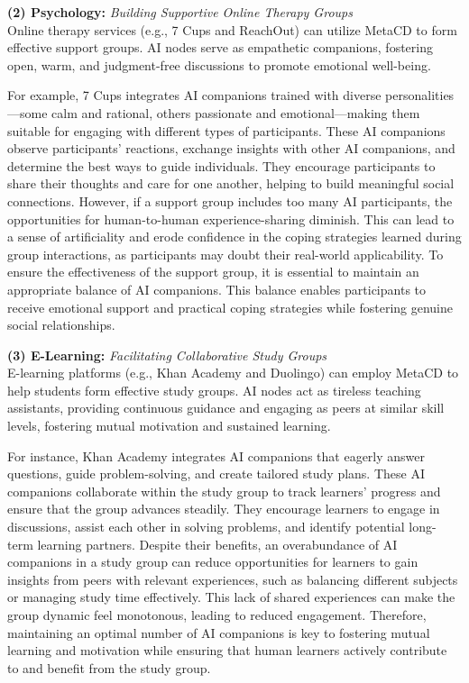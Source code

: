 \noindent \textbf{(2) Psychology:} \textit{Building Supportive Online Therapy Groups}\\ 
Online therapy services (e.g., 7 Cups and ReachOut) can utilize MetaCD to form effective support groups. AI nodes serve as empathetic companions, fostering open, warm, and judgment-free discussions to promote emotional well-being.

For example, 7 Cups integrates AI companions trained with diverse personalities—some calm and rational, others passionate and emotional—making them suitable for engaging with different types of participants. These AI companions observe participants’ reactions, exchange insights with other AI companions, and determine the best ways to guide individuals. They encourage participants to share their thoughts and care for one another, helping to build meaningful social connections. However, if a support group includes too many AI participants, the opportunities for human-to-human experience-sharing diminish. This can lead to a sense of artificiality and erode confidence in the coping strategies learned during group interactions, as participants may doubt their real-world applicability. To ensure the effectiveness of the support group, it is essential to maintain an appropriate balance of AI companions. This balance enables participants to receive emotional support and practical coping strategies while fostering genuine social relationships.

\noindent \textbf{(3) E-Learning:} \textit{Facilitating Collaborative Study Groups}\\
E-learning platforms (e.g., Khan Academy and Duolingo) can employ MetaCD to help students form effective study groups. AI nodes act as tireless teaching assistants, providing continuous guidance and engaging as peers at similar skill levels, fostering mutual motivation and sustained learning.

For instance, Khan Academy integrates AI companions that eagerly answer questions, guide problem-solving, and create tailored study plans. These AI companions collaborate within the study group to track learners’ progress and ensure that the group advances steadily. They encourage learners to engage in discussions, assist each other in solving problems, and identify potential long-term learning partners. Despite their benefits, an overabundance of AI companions in a study group can reduce opportunities for learners to gain insights from peers with relevant experiences, such as balancing different subjects or managing study time effectively. This lack of shared experiences can make the group dynamic feel monotonous, leading to reduced engagement. Therefore, maintaining an optimal number of AI companions is key to fostering mutual learning and motivation while ensuring that human learners actively contribute to and benefit from the study group.

